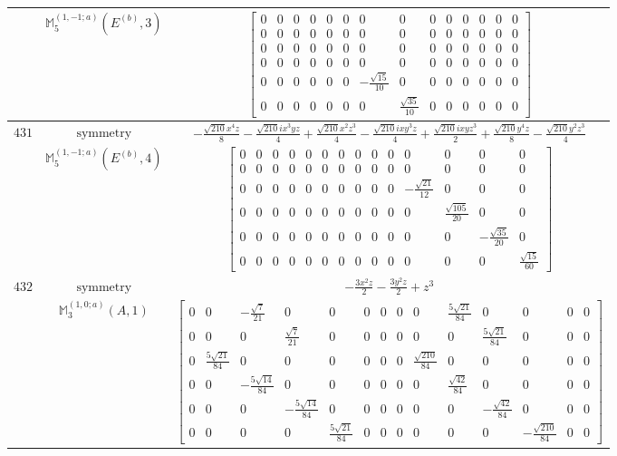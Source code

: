 \documentclass[fleqn,8pt,landscape]{jsarticle}
\begin{document}
\begin{longtable}{ccc}
$  $ & $ \mathbb{M}_{5}^{(1,-1;a)}(E^{(b)},3) $ & $ \begin{bmatrix} 0 & 0 & 0 & 0 & 0 & 0 & 0 & 0 & 0 & 0 & 0 & 0 & 0 & 0 \\ 0 & 0 & 0 & 0 & 0 & 0 & 0 & 0 & 0 & 0 & 0 & 0 & 0 & 0 \\ 0 & 0 & 0 & 0 & 0 & 0 & 0 & 0 & 0 & 0 & 0 & 0 & 0 & 0 \\ 0 & 0 & 0 & 0 & 0 & 0 & 0 & 0 & 0 & 0 & 0 & 0 & 0 & 0 \\ 0 & 0 & 0 & 0 & 0 & 0 & - \frac{\sqrt{15}}{10} & 0 & 0 & 0 & 0 & 0 & 0 & 0 \\ 0 & 0 & 0 & 0 & 0 & 0 & 0 & \frac{\sqrt{35}}{10} & 0 & 0 & 0 & 0 & 0 & 0 \end{bmatrix} $ \\ \hline
$ 431 $ & $ \text{symmetry} $ & $ - \frac{\sqrt{210} x^{4} z}{8} - \frac{\sqrt{210} i x^{3} y z}{4} + \frac{\sqrt{210} x^{2} z^{3}}{4} - \frac{\sqrt{210} i x y^{3} z}{4} + \frac{\sqrt{210} i x y z^{3}}{2} + \frac{\sqrt{210} y^{4} z}{8} - \frac{\sqrt{210} y^{2} z^{3}}{4} $ \\
$  $ & $ \mathbb{M}_{5}^{(1,-1;a)}(E^{(b)},4) $ & $ \begin{bmatrix} 0 & 0 & 0 & 0 & 0 & 0 & 0 & 0 & 0 & 0 & 0 & 0 & 0 & 0 \\ 0 & 0 & 0 & 0 & 0 & 0 & 0 & 0 & 0 & 0 & 0 & 0 & 0 & 0 \\ 0 & 0 & 0 & 0 & 0 & 0 & 0 & 0 & 0 & 0 & - \frac{\sqrt{21}}{12} & 0 & 0 & 0 \\ 0 & 0 & 0 & 0 & 0 & 0 & 0 & 0 & 0 & 0 & 0 & \frac{\sqrt{105}}{20} & 0 & 0 \\ 0 & 0 & 0 & 0 & 0 & 0 & 0 & 0 & 0 & 0 & 0 & 0 & - \frac{\sqrt{35}}{20} & 0 \\ 0 & 0 & 0 & 0 & 0 & 0 & 0 & 0 & 0 & 0 & 0 & 0 & 0 & \frac{\sqrt{15}}{60} \end{bmatrix} $ \\ \hline
$ 432 $ & $ \text{symmetry} $ & $ - \frac{3 x^{2} z}{2} - \frac{3 y^{2} z}{2} + z^{3} $ \\
$  $ & $ \mathbb{M}_{3}^{(1,0;a)}(A,1) $ & $ \begin{bmatrix} 0 & 0 & - \frac{\sqrt{7}}{21} & 0 & 0 & 0 & 0 & 0 & 0 & \frac{5 \sqrt{21}}{84} & 0 & 0 & 0 & 0 \\ 0 & 0 & 0 & \frac{\sqrt{7}}{21} & 0 & 0 & 0 & 0 & 0 & 0 & \frac{5 \sqrt{21}}{84} & 0 & 0 & 0 \\ 0 & \frac{5 \sqrt{21}}{84} & 0 & 0 & 0 & 0 & 0 & 0 & \frac{\sqrt{210}}{84} & 0 & 0 & 0 & 0 & 0 \\ 0 & 0 & - \frac{5 \sqrt{14}}{84} & 0 & 0 & 0 & 0 & 0 & 0 & \frac{\sqrt{42}}{84} & 0 & 0 & 0 & 0 \\ 0 & 0 & 0 & - \frac{5 \sqrt{14}}{84} & 0 & 0 & 0 & 0 & 0 & 0 & - \frac{\sqrt{42}}{84} & 0 & 0 & 0 \\ 0 & 0 & 0 & 0 & \frac{5 \sqrt{21}}{84} & 0 & 0 & 0 & 0 & 0 & 0 & - \frac{\sqrt{210}}{84} & 0 & 0 \end{bmatrix} $ \\ \hline

\end{longtable}
\end{document}
